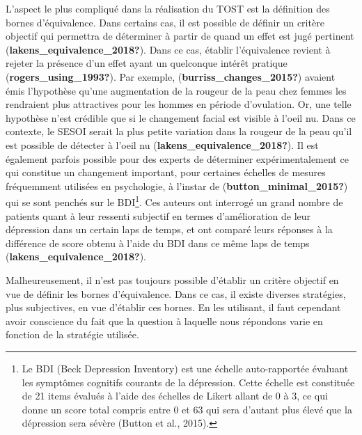 \documentclass[
  english,
  man]{apa6}
\begin{document}
L'aspect le plus compliqué dans la réalisation du TOST est la définition des bornes d'équivalence. Dans certains cas, il est possible de définir un critère objectif qui permettra de déterminer à partir de quand un effet est jugé pertinent (\textbf{lakens\_equivalence\_2018?}). Dans ce cas, établir l'équivalence revient à rejeter la présence d'un effet ayant un quelconque intérêt pratique (\textbf{rogers\_using\_1993?}). Par exemple, (\textbf{burriss\_changes\_2015?}) avaient émis l'hypothèse qu'une augmentation de la rougeur de la peau chez femmes les rendraient plus attractives pour les hommes en période d'ovulation. Or, une telle hypothèse n'est crédible que si le changement facial est visible à l'oeil nu. Dans ce contexte, le SESOI serait la plus petite variation dans la rougeur de la peau qu'il est possible de détecter à l'oeil nu (\textbf{lakens\_equivalence\_2018?}). Il est également parfois possible pour des experts de déterminer expérimentalement ce qui constitue un changement important, pour certaines échelles de mesures fréquemment utilisées en psychologie, à l'instar de (\textbf{button\_minimal\_2015?}) qui se sont penchés sur le BDI\footnote{Le BDI (Beck Depression Inventory) est une échelle auto-rapportée évaluant les symptômes cognitifs courants de la dépression.  Cette échelle est constituée de 21 items évalués à l'aide des échelles de Likert allant de 0 à 3, ce qui donne un score total compris entre 0 et 63 qui sera d'autant plus élevé que la dépression sera sévère (Button et al., 2015).}. Ces auteurs ont interrogé un grand nombre de patients quant à leur ressenti subjectif en termes d'amélioration de leur dépression dans un certain laps de temps, et ont comparé leurs réponses à la différence de score obtenu à l'aide du BDI dans ce même laps de temps (\textbf{lakens\_equivalence\_2018?}).

Malheureusement, il n'est pas toujours possible d'établir un critère objectif en vue de définir les bornes d'équivalence. Dans ce cas, il existe diverses stratégies, plus subjectives, en vue d'établir ces bornes. En les utilisant, il faut cependant avoir conscience du fait que la question à laquelle nous répondons varie en fonction de la stratégie utilisée.
\end{document}
